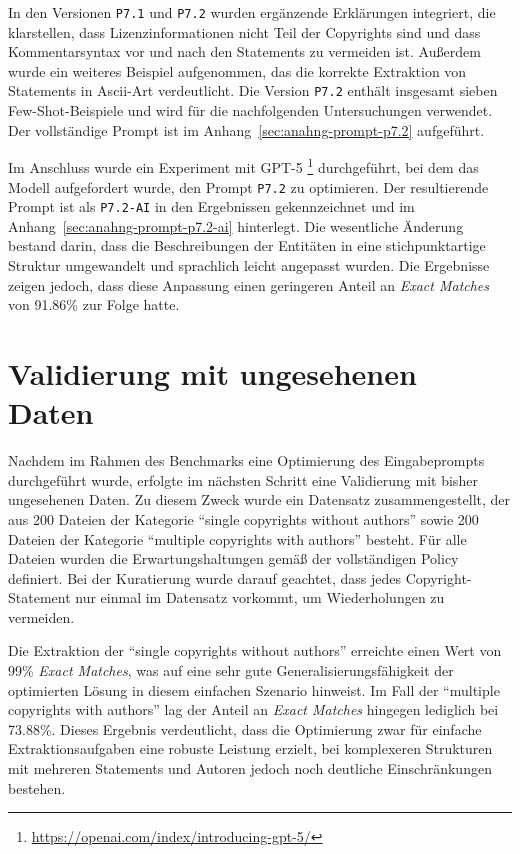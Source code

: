 In den Versionen \texttt{P7.1} und \texttt{P7.2} wurden ergänzende Erklärungen integriert, die klarstellen, dass Lizenzinformationen nicht Teil der Copyrights sind und dass Kommentarsyntax vor und nach den Statements zu vermeiden ist.
Außerdem wurde ein weiteres Beispiel aufgenommen, das die korrekte Extraktion von Statements in Ascii-Art verdeutlicht.
Die Version \texttt{P7.2} enthält insgesamt sieben Few-Shot-Beispiele und wird für die nachfolgenden Untersuchungen verwendet.
Der vollständige Prompt ist im Anhang~\ref{sec:anahng-prompt-p7.2} aufgeführt.

Im Anschluss wurde ein Experiment mit GPT-5 \footnote{\url{https://openai.com/index/introducing-gpt-5/}} durchgeführt, bei dem das Modell aufgefordert wurde, den Prompt \texttt{P7.2} zu optimieren.
Der resultierende Prompt ist als \texttt{P7.2-AI} in den Ergebnissen gekennzeichnet und im Anhang~\ref{sec:anahng-prompt-p7.2-ai} hinterlegt.
Die wesentliche Änderung bestand darin, dass die Beschreibungen der Entitäten in eine stichpunktartige Struktur umgewandelt und sprachlich leicht angepasst wurden.
Die Ergebnisse zeigen jedoch, dass diese Anpassung einen geringeren Anteil an \textit{Exact Matches} von \num{91.86}\% zur Folge hatte.


\section{Validierung mit ungesehenen Daten}

Nachdem im Rahmen des Benchmarks eine Optimierung des Eingabeprompts durchgeführt wurde, erfolgte im nächsten Schritt eine Validierung mit bisher ungesehenen Daten.
Zu diesem Zweck wurde ein Datensatz zusammengestellt, der aus \num{200} Dateien der Kategorie \enquote{single copyrights without authors} sowie \num{200} Dateien der Kategorie \enquote{multiple copyrights with authors} besteht.
Für alle Dateien wurden die Erwartungshaltungen gemäß der vollständigen Policy definiert.
Bei der Kuratierung wurde darauf geachtet, dass jedes Copyright-Statement nur einmal im Datensatz vorkommt, um Wiederholungen zu vermeiden.

Die Extraktion der \enquote{single copyrights without authors} erreichte einen Wert von \num{99}\% \textit{Exact Matches}, was auf eine sehr gute Generalisierungsfähigkeit der optimierten Lösung in diesem einfachen Szenario hinweist.
Im Fall der \enquote{multiple copyrights with authors} lag der Anteil an \textit{Exact Matches} hingegen lediglich bei \num{73.88}\%.
Dieses Ergebnis verdeutlicht, dass die Optimierung zwar für einfache Extraktionsaufgaben eine robuste Leistung erzielt, bei komplexeren Strukturen mit mehreren Statements und Autoren jedoch noch deutliche Einschränkungen bestehen.

